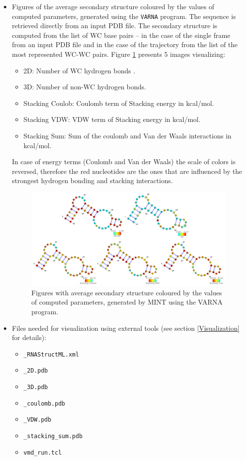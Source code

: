 \documentclass[12pt]{article}
\begin{document}
\begin{itemize}
\item Figures of the average secondary structure coloured by the values of computed parameters, generated using the  {\tt VARNA} \cite{Blin2009} program. The sequence is retrieved directly from an input PDB file. The secondary structure is computed from the list of WC base pairs -- in the case of the single frame from an input PDB file and in the case of the trajectory from the list of the most represented WC-WC pairs. Figure \ref{varna} presents 5 images visualizing:
\begin{itemize}
\item 2D: Number of WC hydrogen bonds .
\item 3D: Number of non-WC hydrogen bonds.
\item Stacking Coulob: Coulomb term of Stacking energy in kcal/mol. 
\item Stacking VDW: VDW term of Stacking energy in kcal/mol.
\item Stacking Sum: Sum of the coulomb and Van der Waals interactions in kcal/mol. 
\end{itemize}

In case of energy terms (Coulomb and Van der Waals) the scale of colors is reversed, therefore the red nucleotides are the ones that are influenced by the strongest hydrogen bonding and stacking interactions.  

\begin{figure}[h!]
\centering
\includegraphics[scale=0.6]{./pictures/varna3.png}
\caption{Figures with average secondary structure coloured by the values of computed parameters, generated by MINT using the  VARNA \cite{Blin2009} program.}
\label{varna}
\end{figure}


\newpage

\item Files needed for visualization using external tools (see section \ref{Visualization} for details):
\begin{itemize}
\item \texttt{\_RNAStructML.xml} 
\item \texttt{\_2D.pdb}
\item \texttt{\_3D.pdb}
\item \texttt{\_coulomb.pdb}
\item \texttt{\_VDW.pdb}
\item \texttt{\_stacking\_sum.pdb}
\item \texttt{vmd\_run.tcl}
\end{itemize}
\end{itemize}
\end{document}
